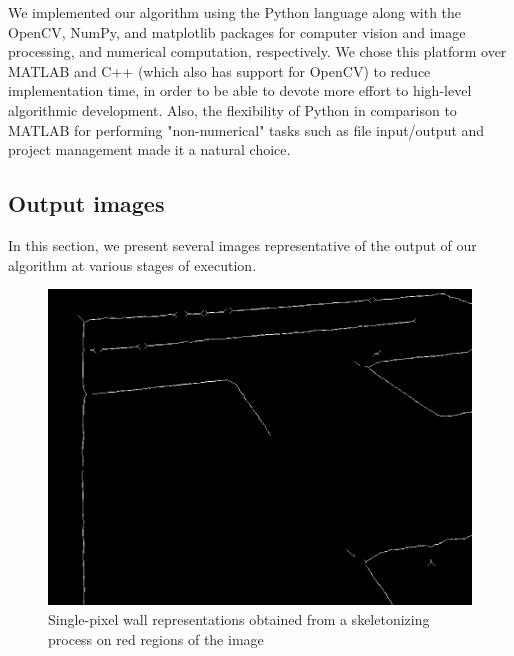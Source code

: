 \documentclass[10pt,twocolumn,letterpaper]{article}
\begin{document}
We implemented our algorithm using the Python language along with the OpenCV, NumPy, and matplotlib packages for
computer vision and image processing, and numerical computation, respectively.  We chose this platform over MATLAB and
C++ (which also has support for OpenCV) to reduce implementation time, in order to be able to devote more effort to
high-level algorithmic development.  Also, the flexibility of Python in comparison to MATLAB for performing 
"non-numerical" tasks such as file input/output and project management made it a natural choice.

\subsection{Output images}
\label{sub:output_images}

In this section, we present several images representative of the output of our algorithm at various stages of execution.
\vfill
\clearpage

\begin{figure}[h!]
\begin{center}
	\includegraphics[width=0.8\linewidth]{images/skeleton.png}
\end{center}
\caption{Single-pixel wall representations obtained from a skeletonizing process on red regions of the image}
\label{fig:skeleton}
\end{figure}
\end{document}
